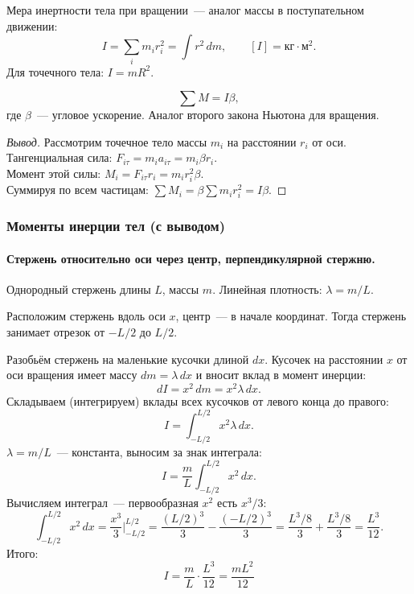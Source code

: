 \documentclass[12pt]{article}
\begin{document}
\begin{definition}
	Мера инертности тела при вращении~--- аналог массы в поступательном движении:
	\[
		I = \sum_i m_i r_i^2 = \int r^2 \, dm, \qquad [I] = \text{кг}\cdot\text{м}^2.
	\]
	Для точечного тела: $I = mR^2$.
\end{definition}

\begin{definition}
	\[
		\sum M = I \beta,
	\]
	где $\beta$~--- угловое ускорение. Аналог второго закона Ньютона для вращения.
\end{definition}
\begin{proof}[Вывод]
	Рассмотрим точечное тело массы $m_i$ на расстоянии $r_i$ от оси. Тангенциальная сила: $F_{i\tau} = m_i a_{i\tau} = m_i \beta r_i$.\\
	Момент этой силы: $M_i = F_{i\tau} r_i = m_i r_i^2 \beta$.\\
	Суммируя по всем частицам: $\sum M_i = \beta \sum m_i r_i^2 = I\beta$.
\end{proof}

\subsubsection{Моменты инерции тел (с выводом)}

\paragraph{Стержень относительно оси через центр, перпендикулярной стержню.}

Однородный стержень длины $L$, массы $m$. Линейная плотность: $\lambda = m/L$.

Расположим стержень вдоль оси $x$, центр~--- в начале координат. Тогда стержень
занимает отрезок от $-L/2$ до $L/2$.

Разобьём стержень на маленькие кусочки длиной $dx$. Кусочек на расстоянии $x$
от оси вращения имеет массу $dm = \lambda\,dx$ и вносит вклад в момент инерции:
\[
	dI = x^2\,dm = x^2 \lambda\,dx.
\]
Складываем (интегрируем) вклады всех кусочков от левого конца до правого:
\[
	I = \int_{-L/2}^{L/2} x^2 \lambda\,dx.
\]
$\lambda = m/L$~--- константа, выносим за знак интеграла:
\[
	I = \frac{m}{L}\int_{-L/2}^{L/2} x^2\,dx.
\]
Вычисляем интеграл~--- первообразная $x^2$ есть $x^3/3$:
\[
	\int_{-L/2}^{L/2} x^2\,dx
	= \frac{x^3}{3}\Bigg|_{-L/2}^{L/2}
	= \frac{(L/2)^3}{3} - \frac{(-L/2)^3}{3}
	= \frac{L^3/8}{3} + \frac{L^3/8}{3}
	= \frac{L^3}{12}.
\]
Итого:
\[
	\boxed{I = \frac{m}{L}\cdot\frac{L^3}{12} = \frac{mL^2}{12}}
\]
\end{document}
